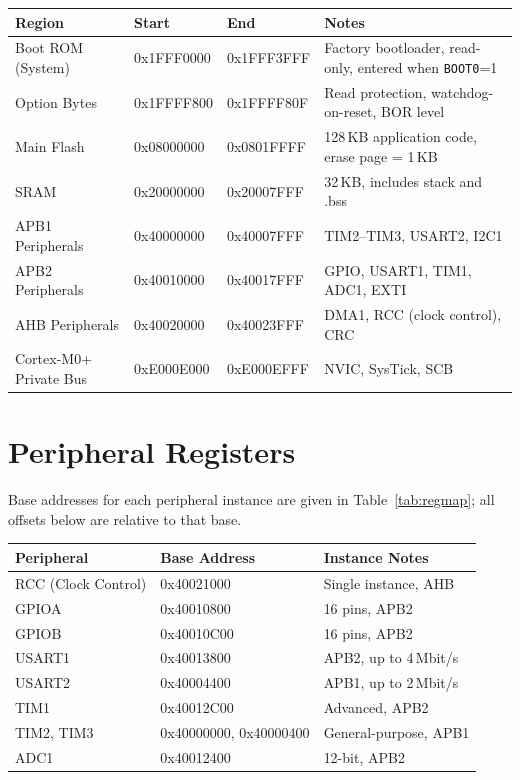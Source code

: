 \documentclass[11pt,a4paper,parskip=half]{scrartcl}
\begin{document}
\begin{center}
\begin{tabularx}{\textwidth}{@{}l l l Y@{}}
\toprule
\textbf{Region} & \textbf{Start} & \textbf{End} & \textbf{Notes} \\
\midrule
Boot ROM (System) & 0x1FFF0000 & 0x1FFF3FFF & Factory bootloader, read-only, entered when \texttt{BOOT0}=1 \\
Option Bytes & 0x1FFFF800 & 0x1FFFF80F & Read protection, watchdog-on-reset, BOR level \\
Main Flash & 0x08000000 & 0x0801FFFF & 128\,KB application code, erase page = 1\,KB \\
SRAM & 0x20000000 & 0x20007FFF & 32\,KB, includes stack and .bss \\
APB1 Peripherals & 0x40000000 & 0x40007FFF & TIM2--TIM3, USART2, I2C1 \\
APB2 Peripherals & 0x40010000 & 0x40017FFF & GPIO, USART1, TIM1, ADC1, EXTI \\
AHB Peripherals & 0x40020000 & 0x40023FFF & DMA1, RCC (clock control), CRC \\
Cortex-M0+ Private Bus & 0xE000E000 & 0xE000EFFF & NVIC, SysTick, SCB \\
\bottomrule
\end{tabularx}
\end{center}

\newpage

\section{Peripheral Registers}

Base addresses for each peripheral instance are given in
Table~\ref{tab:regmap}; all offsets below are relative to that base.

\begin{center}
\begin{tabularx}{\textwidth}{@{}l l Y@{}}
\toprule
\textbf{Peripheral} & \textbf{Base Address} & \textbf{Instance Notes} \\
\midrule
RCC (Clock Control) & 0x40021000 & Single instance, AHB \\
GPIOA & 0x40010800 & 16 pins, APB2 \\
GPIOB & 0x40010C00 & 16 pins, APB2 \\
USART1 & 0x40013800 & APB2, up to 4\,Mbit/s \\
USART2 & 0x40004400 & APB1, up to 2\,Mbit/s \\
TIM1 & 0x40012C00 & Advanced, APB2 \\
TIM2, TIM3 & 0x40000000, 0x40000400 & General-purpose, APB1 \\
ADC1 & 0x40012400 & 12-bit, APB2 \\
\bottomrule
\end{tabularx}
\label{tab:regmap}
\end{center}
\end{document}
